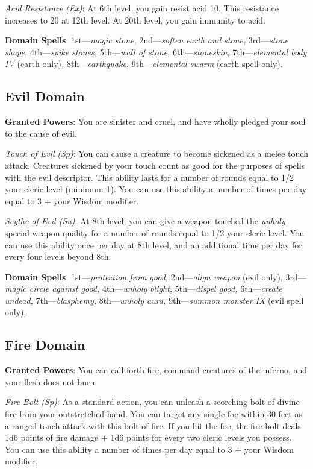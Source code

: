 \textit{Acid Resistance (Ex)}: At 6th level, you gain resist acid 10. This resistance increases to 20 at 12th level.
At 20th level, you gain immunity to acid.
				
\textbf{Domain Spells}: 1st---\textit{magic stone, }2nd---\textit{soften earth and stone, }3rd---\textit{stone shape, }4th---\textit{spike stones, }5th---\textit{wall of stone, }6th---\textit{stoneskin, }7th---\textit{elemental body IV }(earth only)\textit{, }8th---\textit{earthquake, }9th---\textit{elemental swarm }(earth spell only).
				
\subsection{Evil Domain}

				
\textbf{Granted Powers}: You are sinister and cruel, and have wholly pledged your soul to the cause of evil.
				
\textit{Touch of Evil} \textit{(Sp)}: You can cause a creature to become sickened as a melee touch attack. 
Creatures sickened by your touch count as good for the purposes of spells with the evil descriptor. This ability 
lasts for a number of rounds equal to 1/2 your cleric level (minimum 1). You can use this ability a number of 
times per day equal to 3 + your Wisdom modifier.
				
\textit{Scythe of Evil (Su)}: At 8th level, you can give a weapon touched the\textit{ unholy }special weapon quality
for a number of rounds equal to 1/2 your cleric level. You can use this ability once per day at 8th level, and an 
additional time per day for every four levels beyond 8th.
				
\textbf{Domain Spells}: 1st---\textit{protection from good, }2nd---\textit{align weapon }(evil only), 3rd---\textit{magic circle against good, }4th---\textit{unholy blight, }5th---\textit{dispel good, }6th---\textit{create undead, }7th---\textit{blasphemy, }8th---\textit{unholy aura, }9th---\textit{summon monster IX} (evil spell only). 
				
\subsection{Fire Domain}

				
\textbf{Granted Powers}: You can call forth fire, command creatures of the inferno, and your flesh does not burn.
				
\textit{Fire Bolt (Sp)}: As a standard action, you can unleash a scorching bolt of divine fire from your 
outstretched hand. You can target any single foe within 30 feet as a ranged touch attack with this bolt of fire.
If you hit the foe, the fire bolt deals 1d6 points of fire damage + 1d6 points for every two cleric levels 
you possess. You can use this ability a number of times per day equal to 3 + your Wisdom modifier. 
				
